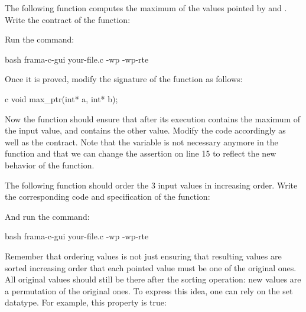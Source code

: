 


The following function computes the maximum of the values pointed by
 and . Write the contract of the function:






Run the command:



\begin{CodeBlock}{bash}
frama-c-gui your-file.c -wp -wp-rte
\end{CodeBlock}



Once it is proved, modify the signature of the function as follows:



\begin{CodeBlock}{c}
void max_ptr(int* a, int* b);
\end{CodeBlock}


Now the function should ensure that after its execution 
contains the maximum of the input value, and  contains the
other value. Modify the code accordingly as well as the contract. Note that
the variable  is not necessary anymore in the 
function and that we can change the assertion on line 15 to reflect the
new behavior of the function.






The following function should order the 3 input values in increasing order.
Write the corresponding code and specification of the function:




And run the command:


\begin{CodeBlock}{bash}
frama-c-gui your-file.c -wp -wp-rte
\end{CodeBlock}


Remember that ordering values is not just ensuring that resulting values
are sorted increasing order that each pointed value must be one of the original
ones. All original values should still be there after the sorting operation:
new values are a permutation of the original ones. To express this idea, one
can rely on the set datatype. For example, this property is true:


